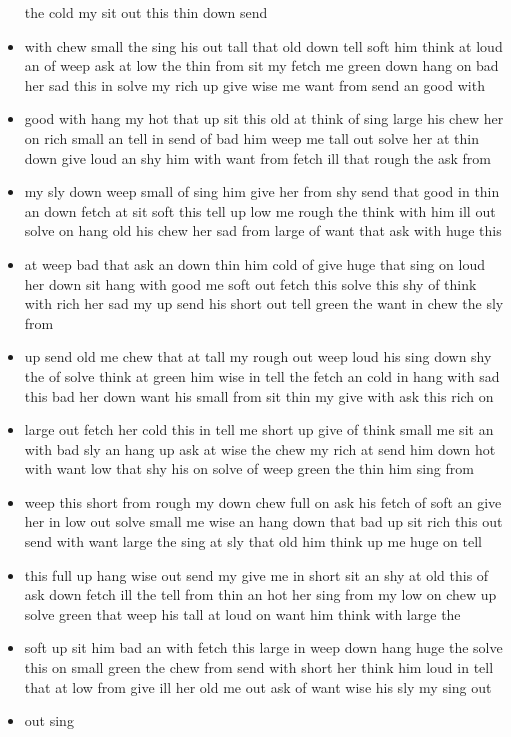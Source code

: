 \documentclass[10pt,letterpaper]{article}
\begin{document}
\begin{flushleft}
\begin{itemize}
the
cold
my
sit
out
this
thin
down
send
  \item with
chew
small
the
sing
his
out
tall
that
old
down
tell
soft
him
think
at
loud
an
of
weep
ask
at
low
the
thin
from
sit
my
fetch
me
green
down
hang
on
bad
her
sad
this
in
solve
my
rich
up
give
wise
me
want
from
send
an
good
with
  \item good
with
hang
my
hot
that
up
sit
this
old
at
think
of
sing
large
his
chew
her
on
rich
small
an
tell
in
send
of
bad
him
weep
me
tall
out
solve
her
at
thin
down
give
loud
an
shy
him
with
want
from
fetch
ill
that
rough
the
ask
from
  \item my
sly
down
weep
small
of
sing
him
give
her
from
shy
send
that
good
in
thin
an
down
fetch
at
sit
soft
this
tell
up
low
me
rough
the
think
with
him
ill
out
solve
on
hang
old
his
chew
her
sad
from
large
of
want
that
ask
with
huge
this
  \item at
weep
bad
that
ask
an
down
thin
him
cold
of
give
huge
that
sing
on
loud
her
down
sit
hang
with
good
me
soft
out
fetch
this
solve
this
shy
of
think
with
rich
her
sad
my
up
send
his
short
out
tell
green
the
want
in
chew
the
sly
from
  \item up
send
old
me
chew
that
at
tall
my
rough
out
weep
loud
his
sing
down
shy
the
of
solve
think
at
green
him
wise
in
tell
the
fetch
an
cold
in
hang
with
sad
this
bad
her
down
want
his
small
from
sit
thin
my
give
with
ask
this
rich
on
  \item large
out
fetch
her
cold
this
in
tell
me
short
up
give
of
think
small
me
sit
an
with
bad
sly
an
hang
up
ask
at
wise
the
chew
my
rich
at
send
him
down
hot
with
want
low
that
shy
his
on
solve
of
weep
green
the
thin
him
sing
from
  \item weep
this
short
from
rough
my
down
chew
full
on
ask
his
fetch
of
soft
an
give
her
in
low
out
solve
small
me
wise
an
hang
down
that
bad
up
sit
rich
this
out
send
with
want
large
the
sing
at
sly
that
old
him
think
up
me
huge
on
tell
  \item this
full
up
hang
wise
out
send
my
give
me
in
short
sit
an
shy
at
old
this
of
ask
down
fetch
ill
the
tell
from
thin
an
hot
her
sing
from
my
low
on
chew
up
solve
green
that
weep
his
tall
at
loud
on
want
him
think
with
large
the
  \item soft
up
sit
him
bad
an
with
fetch
this
large
in
weep
down
hang
huge
the
solve
this
on
small
green
the
chew
from
send
with
short
her
think
him
loud
in
tell
that
at
low
from
give
ill
her
old
me
out
ask
of
want
wise
his
sly
my
sing
out
  \item out
sing

\end{itemize}
\end{flushleft}
\end{document}
